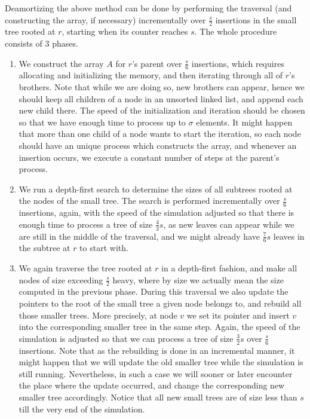 \documentclass[11pt,onecolumn,final]{article} \usepackage{a4}
\theoremstyle{plain}
\theoremstyle{remark}
\begin{document}
Deamortizing the above method can be done by performing the traversal (and constructing the array, if necessary) incrementally over $\frac{s}{2}$ insertions in the small tree rooted at $r$, starting when its counter reaches $s$. The whole procedure consists of 3 phases. 
\begin{enumerate}

\item We construct the array $A$ for $r$'s parent over $\frac{s}{6}$ insertions, which requires allocating and initializing the memory, and then iterating through all of $r$'s brothers. Note that while we are doing so, new brothers can appear, hence we should keep all children of a node in an unsorted linked list, and append each new child there. The speed of the initialization and iteration should be chosen so that we have enough time to process up to $\sigma$ elements. It might happen that more than one child of a node wants to start the iteration, so each node should have an unique process which constructs the array, and whenever an insertion occurs, we execute a constant number of steps at the parent's process.



\item We run a depth-first search to determine the sizes of all subtrees rooted at the nodes of the small tree. The search is performed incrementally over $\frac{s}{6}$ insertions, again, with the speed of the simulation adjusted so that there is enough time to process a tree of size $\frac{4}{3}s$, as new leaves can appear while we are still in the middle of the traversal, and we might already have $\frac{7}{6}s$ leaves in the subtree at $r$ to start with.

\item We again traverse the tree rooted at $r$ in a depth-first fashion, and make all nodes of size exceeding $\frac{s}{2}$ heavy, where by size we actually mean the size computed in the previous phase. During this traversal we also update the pointers to the root of the small tree a given node belongs to, and rebuild all those smaller trees. More precisely, at node $v$ we set its pointer and insert $v$ into the corresponding smaller tree in the same step. Again, the speed of the simulation is adjusted so that we can process a tree of size $\frac{3}{2}s$ over $\frac{s}{6}$ insertions. Note that as the rebuilding is done in an incremental manner, it might happen that we will update the old smaller tree while the simulation is still running. Nevertheless, in such a case we will sooner or later encounter the place where the update occurred, and change the corresponding new smaller tree accordingly. Notice that all new small trees are of size less than $s$ till the very end of the simulation.
\end{enumerate}
\end{document}
